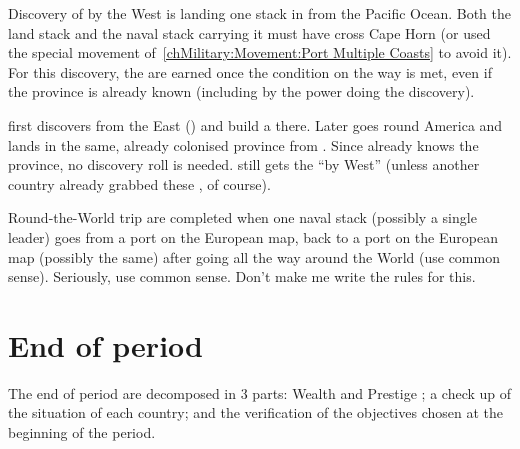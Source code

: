 \bparag Discovery of \granderegionPanama by the West is landing one stack in
\granderegionPanama from the Pacific Ocean. Both the land stack and the naval
stack carrying it must have cross Cape Horn (or used the special movement
of~\ref{chMilitary:Movement:Port Multiple Coasts} to avoid it).
\bparag For this discovery, the \VPs are earned once the condition on
the way is met, even if the province is already known (including by the
power doing the discovery).

\begin{exemple}
  \HIS first discovers \granderegionPanama from the East
  (\seazoneMexique) and build a \COL there. Later \HIS goes round
  America and lands in the same, already colonised province from
  \seazonePanama. Since \HIS already knows the province, no discovery
  roll is needed. \HIS still gets the ``\granderegionPanama by West''
  \VPs (unless another country already grabbed these \VPs, of course).
\end{exemple}


\aparag[Circumnavigation] Round-the-World trip are completed when one
naval stack (possibly a single leader) goes from a port on the European
map, back to a port on the European map (possibly the same) after going
all the way around the World (use common sense).
\bparag Seriously, use common sense. Don't make me write the rules for
this.




\section{End of period \VPs}
\aparag The end of period \VPs are decomposed in 3 parts: Wealth and Prestige
\VPs; a check up of the situation of each country; and the verification of the
objectives chosen at the beginning of the period.


